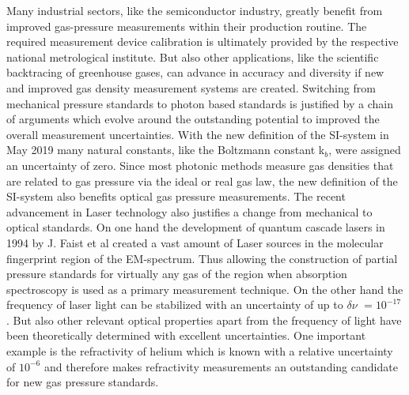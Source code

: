  Many industrial sectors, like the semiconductor industry, greatly benefit from improved gas-pressure measurements within their production routine. The required measurement device calibration is ultimately provided by the respective national metrological institute.  But also other applications, like the scientific backtracing of greenhouse gases, can advance in accuracy and diversity if new and improved gas density measurement systems are created. Switching from mechanical pressure standards to photon based standards is justified by a chain of arguments which evolve around the outstanding potential to improved the overall measurement uncertainties. With the new definition of the SI-system in May 2019 many natural constants, like the Boltzmann constant k$_b$, were assigned an uncertainty of zero. Since most photonic methods measure gas densities that are related to gas pressure via the ideal or real gas law, the new definition of the SI-system also benefits optical gas pressure measurements. The recent advancement in Laser technology also justifies a change from mechanical to optical standards. On one hand the development of quantum cascade lasers in 1994 by J. Faist et al \cite{Faist1994} created a vast amount of Laser sources in the molecular fingerprint region of the EM-spectrum. Thus allowing the construction of partial pressure standards for virtually any gas of the region when absorption spectroscopy is used as a primary measurement technique. On the other hand the frequency of laser light can be stabilized with an uncertainty of up to $\delta \nu$ $=10^{-17}$ \cite{Haefner2015}. But also other relevant optical properties apart from the frequency of light have been theoretically determined with excellent uncertainties. One important example is the refractivity of helium which is known with a relative uncertainty of $10^{-6}$ and therefore makes refractivity measurements an outstanding candidate for new gas pressure standards. 
